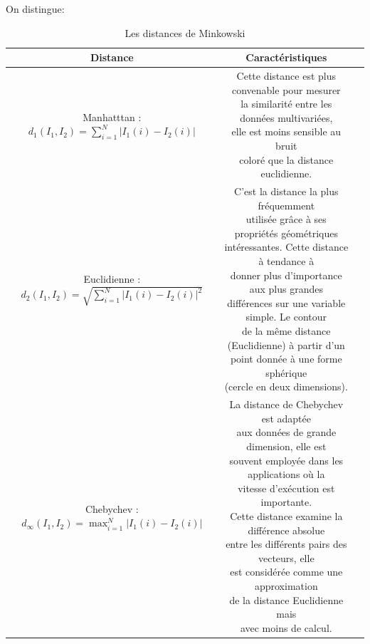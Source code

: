 On distingue:
\begin{table}[H]
	\caption{Les distances de Minkowski}
	\begin{tabular}{|c|c|c|}
		\hline
		\textbf{Distance} & \textbf{Caractéristiques}\\
		\hline
		\makecell{Manhatttan : \\ $  d_1(I_1, I_2) = \sum_{i=1}^{N} \left|{I}_{1}(i)-{I}_{2}(i)\right|  $ } 
		& \makecell{Cette distance est plus convenable pour mesurer\\
			  la similarité entre les données  multivariées,\\ 
			 elle est moins sensible au  bruit\\
			 coloré que la distance euclidienne. }   \\
		\hline
		
		
		\makecell{Euclidienne :\\ $ d_2(I_1, I_2) =  \sqrt{\sum_{i=1}^{N} \left|{I}_{1}(i)-{I}_{2}(i)\right|^2} $}  
		& \makecell{C’est la distance la plus fréquemment \\
			utilisée grâce à ses propriétés géométriques \\
			intéressantes. Cette distance à tendance à \\
			donner plus d’importance aux plus grandes \\
			différences sur une variable simple. Le contour\\
			 de la même distance (Euclidienne) à partir d’un \\
			 point donnée à  une forme sphérique \\(cercle en deux dimensions).}   \\
		\hline
		
		\makecell{Chebychev :\\ 
			$d_{\infty}(I_1, I_2)=\max_{i=1}^N \left|{I}_{1}(i)-{I}_{2}(i)\right|$  
		} 
		 & \makecell{La distance de Chebychev est adaptée \\
		 	aux données de grande dimension, elle est \\
		 	souvent employée dans les applications où la\\
		 	 vitesse d’exécution est importante.\\ 
		 	 Cette distance examine la différence absolue\\
		 	  entre les différents pairs des vecteurs, elle\\
		 	   est considérée comme une approximation\\ 
		 	   de la distance Euclidienne mais\\
		 	    avec moins de calcul.} \\   
		\hline
		
	
	\end{tabular}
	
\end{table}

